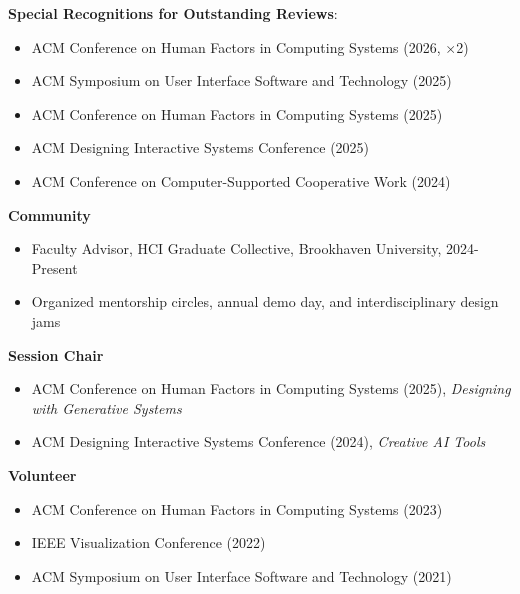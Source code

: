 {} \textbf{Special Recognitions for Outstanding Reviews}:
\vspace{-.5\baselineskip}
\begin{itemize}[leftmargin=1.4em]
  \item ACM Conference on Human Factors in Computing Systems (2026, $\times$2)
  \item ACM Symposium on User Interface Software and Technology (2025)
  \item ACM Conference on Human Factors in Computing Systems (2025)
  \item ACM Designing Interactive Systems Conference (2025)
  \item ACM Conference on Computer-Supported Cooperative Work (2024)
\end{itemize}



\vspace{0.5\rowgap}
\textcolor{basecolor}{\textbf{Community}}

\begin{itemize}[leftmargin=1.4em]
  \item Faculty Advisor, HCI Graduate Collective, Brookhaven University, 2024-Present
  \item Organized mentorship circles, annual demo day, and interdisciplinary design jams
\end{itemize}

\textcolor{basecolor}{\textbf{Session Chair}}
\begin{itemize}[leftmargin=1.4em]
  \item ACM Conference on Human Factors in Computing Systems (2025), \textit{Designing with Generative Systems}
  \item ACM Designing Interactive Systems Conference (2024), \textit{Creative AI Tools}
\end{itemize}


\textcolor{basecolor}{\textbf{Volunteer}}
\begin{itemize}[leftmargin=1.4em]
  \item ACM Conference on Human Factors in Computing Systems (2023)
  \item IEEE Visualization Conference (2022)
  \item ACM Symposium on User Interface Software and Technology (2021)
\end{itemize}
\vspace{12pt}
